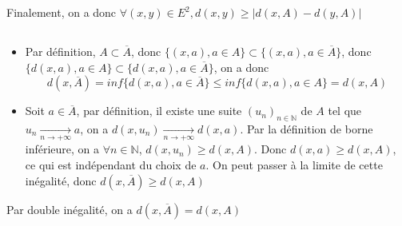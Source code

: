 \documentclass[a4paper,12pt]{book}
\begin{document}
Finalement, on a donc $\boxed{\forall (x,y) \in E^2, d(x,y) \geq |d(x,A)-d(y,A)|}$
\subsection{}
\begin{itemize}
    \item Par définition, $A \subset \overline{A}$, donc $\{(x,a), a\in A\}\subset \{(x,a),a \in \overline{A}\}$, 
    donc $\{d(x,a), a\in A\}\subset \{d(x,a),a \in \overline{A}\}$, on a donc 
    $$
    d(x,\overline{A})=inf\{d(x,a),a \in \overline{A}\} \leq inf\{d(x,a), a\in A\}=d(x,A)
    $$
    \item Soit $a \in \overline{A}$, par définition, il existe une suite $(u_n)_{n \in \mathbb{N}}$ de $A$ tel que $u_n \xrightarrow[n \to +\infty]{}a$, on a 
    $d(x,u_n)\xrightarrow[n \to +\infty]{}d(x,a)$. Par la définition de borne inférieure, on a $\forall n \in \mathbb{N}$, $d(x,u_n) \geq d(x,A)$. 
    Donc $d(x,a) \geq d(x,A)$, ce qui est indépendant du choix de $a$. On peut passer à la limite de cette inégalité, donc $d(x,\overline{A}) \geq d(x,A)$
\end{itemize}
Par double inégalité, on a $\boxed{d(x,\overline{A}) = d(x,A)}$
\end{document}
